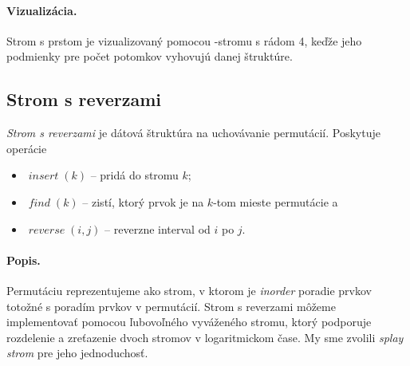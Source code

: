 
\paragraph{Vizualizácia.}
Strom s prstom je vizualizovaný pomocou \Bp-stromu s rádom 4, keďže jeho podmienky pre počet potomkov vyhovujú
danej štruktúre.
\def\find{$\mathop{find}(k)$}

\subsection{Strom s reverzami}
\emph{Strom s reverzami} je dátová štruktúra na uchovávanie permutácií. 
Poskytuje operácie 
\begin{itemize}
\item $\mathop{\mathit{insert}}(k)$ -- pridá do stromu $k$;
\item $\mathop{\mathit{find}}(k)$ -- zistí, ktorý prvok je na $k$-tom mieste permutácie a
\item $\mathop{\mathit{reverse}}(i,j)$ -- reverzne interval od $i$ po $j$.
\end{itemize}

\paragraph{Popis.}
Permutáciu reprezentujeme ako strom, v ktorom je \emph{inorder} poradie prvkov totožné 
s poradím prvkov v permutácií. Strom s reverzami môžeme implementovať pomocou ľubovoľného 
vyváženého stromu, ktorý podporuje rozdelenie a zreťazenie dvoch stromov v logaritmickom čase. 
My sme zvolili \emph{splay strom} pre jeho jednoduchosť. 

